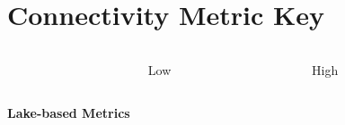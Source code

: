 \documentclass[bigger]{beamer}
\begin{document}

\section{Connectivity Metric Key}
\begin{frame}
  \begin{center}

    \begin{columns}[b]     
      \begin{column}{0.4\textwidth}        
      \end{column}
  
      \begin{column}{0.25\textwidth}
        \huge{Low}
      \end{column}
    
      \begin{column}{0.25\textwidth}
        \huge{High}
      \end{column}
   \end{columns}

  \begin{columns}    
    \begin{column}[b]{0.4\textwidth}
      \vspace{2em}
    \end{column}

  \begin{column}[b]{0.25\textwidth}
  \end{column}
  
  \begin{column}[b]{0.25\textwidth}
  \end{column}
  \end{columns}

  \begin{columns}[T]    
    \begin{column}{0.4\textwidth}
      {\fontsize{65}{65}\textbf{Lake-based Metrics}}
      \vspace{3em}
    \end{column}

  \begin{column}{0.25\textwidth}
  \end{column}
  
  \begin{column}{0.25\textwidth}
  \end{column}
  \end{columns}
  

\end{center}
\end{frame}
\end{document}
